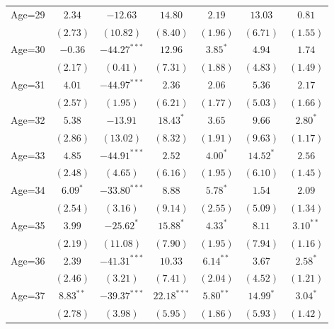 \documentclass[fullpage]{paper}
\begin{document}
\begin{center}
\begin{longtable}{l c c c c c c }
Age=29      & $2.34$       & $-12.63$       & $14.80$       & $2.19$       & $13.03$       & $0.81$        \\
            & $(2.73)$     & $(10.82)$      & $(8.40)$      & $(1.96)$     & $(6.71)$      & $(1.55)$      \\
Age=30      & $-0.36$      & $-44.27^{***}$ & $12.96$       & $3.85^{*}$   & $4.94$        & $1.74$        \\
            & $(2.17)$     & $(0.41)$       & $(7.31)$      & $(1.88)$     & $(4.83)$      & $(1.49)$      \\
Age=31      & $4.01$       & $-44.97^{***}$ & $2.36$        & $2.06$       & $5.36$        & $2.17$        \\
            & $(2.57)$     & $(1.95)$       & $(6.21)$      & $(1.77)$     & $(5.03)$      & $(1.66)$      \\
Age=32      & $5.38$       & $-13.91$       & $18.43^{*}$   & $3.65$       & $9.66$        & $2.80^{*}$    \\
            & $(2.86)$     & $(13.02)$      & $(8.32)$      & $(1.91)$     & $(9.63)$      & $(1.17)$      \\
Age=33      & $4.85$       & $-44.91^{***}$ & $2.52$        & $4.00^{*}$   & $14.52^{*}$   & $2.56$        \\
            & $(2.48)$     & $(4.65)$       & $(6.16)$      & $(1.95)$     & $(6.10)$      & $(1.45)$      \\
Age=34      & $6.09^{*}$   & $-33.80^{***}$ & $8.88$        & $5.78^{*}$   & $1.54$        & $2.09$        \\
            & $(2.54)$     & $(3.16)$       & $(9.14)$      & $(2.55)$     & $(5.09)$      & $(1.34)$      \\
Age=35      & $3.99$       & $-25.62^{*}$   & $15.88^{*}$   & $4.33^{*}$   & $8.11$        & $3.10^{**}$   \\
            & $(2.19)$     & $(11.08)$      & $(7.90)$      & $(1.95)$     & $(7.94)$      & $(1.16)$      \\
Age=36      & $2.39$       & $-41.31^{***}$ & $10.33$       & $6.14^{**}$  & $3.67$        & $2.58^{*}$    \\
            & $(2.46)$     & $(3.21)$       & $(7.41)$      & $(2.04)$     & $(4.52)$      & $(1.21)$      \\
Age=37      & $8.83^{**}$  & $-39.37^{***}$ & $22.18^{***}$ & $5.80^{**}$  & $14.99^{*}$   & $3.04^{*}$    \\
            & $(2.78)$     & $(3.98)$       & $(5.95)$      & $(1.86)$     & $(5.93)$      & $(1.42)$      \\

\end{longtable}
\end{center}
\end{document}
